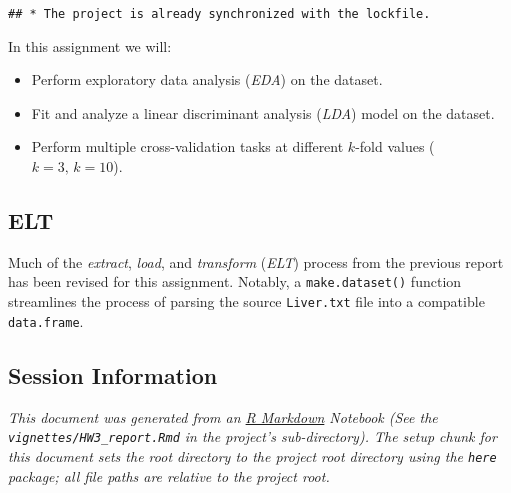 \documentclass[
  11pt,
  a4paper,
]{scrartcl}
\providecommand{\tightlist}{%
  \setlength{\itemsep}{0pt}\setlength{\parskip}{0pt}}
\begin{document}
\begin{verbatim}
## * The project is already synchronized with the lockfile.
\end{verbatim}

In this assignment we will:

\begin{itemize}
\tightlist
\item
  Perform exploratory data analysis (\emph{EDA}) on the dataset.
\item
  Fit and analyze a linear discriminant analysis (\emph{LDA}) model on
  the dataset.
\item
  Perform multiple cross-validation tasks at different \(k\)-fold values
  (\(k=3,\,k=10\)).
\end{itemize}

\hypertarget{elt}{%
\subsection{ELT}\label{elt}}

Much of the \emph{extract}, \emph{load}, and \emph{transform}
(\emph{ELT}) process from the previous report has been revised for this
assignment. Notably, a \texttt{make.dataset()} function streamlines the
process of parsing the source \texttt{Liver.txt} file into a compatible
\texttt{data.frame}.

\newpage

\hypertarget{session-information}{%
\subsection{Session Information}\label{session-information}}

\emph{This document was generated from an
\href{http://rmarkdown.rstudio.com}{R Markdown} Notebook (See the
\texttt{vignettes/HW3\_report.Rmd} in the project's sub-directory). The
setup chunk for this document sets the root directory to the project
root directory using the \texttt{here} package; all file paths are
relative to the project root.}
\end{document}
